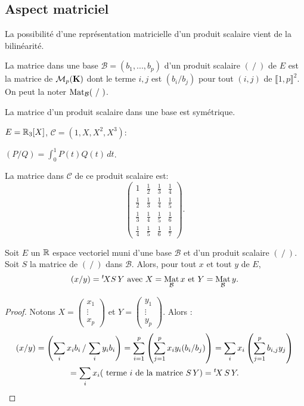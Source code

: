 \subsection{Aspect matriciel}
La possibilité d'une représentation matricielle d'un produit scalaire vient de la bilinéarité.
\begin{defi}
La matrice dans une base $\mathcal{B} = (b_1, ..., b_p)$ d'un produit scalaire $(~/~)$ de $E$ est la matrice de $\mathcal{M}_{p}(\mathbf{K})$ dont le terme $i,j$ est $(b_i/b_j)$ pour tout $(i,j)$ de $\llbracket 1,p \rrbracket^2$.  On peut la noter $\mathop{\mathrm{Mat}}_\mathcal{B} (~/~)$.
\end{defi}
\begin{prop}
La matrice d'un produit scalaire dans une base est symétrique.
\end{prop}
\begin{exple}
$E = \mathbb{R}_{3}[X]$, $\mathcal{C} = (1, X, X^2, X^3)$:
\begin{center}
$(P/Q) = \displaystyle \int_{0}^{1} P(t)Q(t) \, dt$.
\end{center}
La matrice dans $\mathcal{C}$ de ce produit scalaire est:
\begin{displaymath}
\renewcommand{\arraystretch}{1.8}
\begin{pmatrix}
1 & \frac{1}{2} & \frac{1}{3} & \frac{1}{4} \\
\frac{1}{2} & \frac{1}{3} & \frac{1}{4} & \frac{1}{5} \\
\frac{1}{3} & \frac{1}{4} & \frac{1}{5} & \frac{1}{6} \\
\frac{1}{4} & \frac{1}{5} & \frac{1}{6} & \frac{1}{7}
\end{pmatrix}.
\end{displaymath}
\end{exple}
\newpage
\begin{prop}
Soit $E$ un $\mathbb{R}$ espace vectoriel muni d'une base $\mathcal{B}$ et d'un produit scalaire  $(~/~)$. Soit $S$ la matrice de $(~/~)$ dans $\mathcal{B}$. Alors, pour tout $x$ et tout $y$ de $E$,
\begin{displaymath}
(x/y) = \mathstrut^t\! X S\,Y \text{ avec } X = \mathop{\mathrm{Mat}}_\mathcal{B} x \text{ et } Y = \mathop{\mathrm{Mat}}_\mathcal{B} y .
\end{displaymath}
\end{prop}
\begin{proof}
Notons $X = \begin{pmatrix} x_1 \\ \vdots \\ x_p \end{pmatrix}$ et $Y = \begin{pmatrix} y_1 \\ \vdots \\ y_p \end{pmatrix}$. Alors :
\begin{multline*}
(x/y) = \left( \sum_{i} x_i b_i \left/ \right. \sum_{i} y_i b_i \right)
 = \sum_{i=1}^{p} \left( \sum_{j=1}^{p} x_i y_i (b_i/b_j) \right)
 = \sum_{i} x_i \left( \sum_{j=1}^{p} b_{i,j} y_j \right)\\
 = \sum_{i} x_i (\text{ terme $i$ de la matrice }S\,Y) = \mathstrut^t\! X\,S\,Y .
\end{multline*}
\end{proof}
